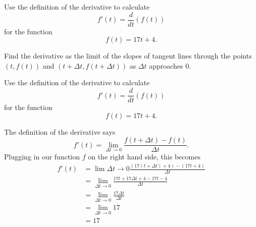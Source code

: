 \documentclass{ximera}
\author{Emma Smith Zbarsky}
\begin{document}
\begin{exercise}

Use the definition of the derivative to calculate
\[f'(t) = \frac{d}{dt}(f(t))\] for the function \[f(t) = 17t+4.\]


\begin{hint}
Find the derivative as the limit of the slopes of tangent lines through
the points $(t,f(t))$ and $(t+\Delta t, f(t+\Delta t))$ as $\Delta t$
approaches 0.
\end{hint}


\begin{hint}
Use the definition of the derivative to calculate
\[f'(t) = \frac{d}{dt}(f(t))\] for the function \[f(t) = 17t+4.\]

The definition of the derivative says
\[f'(t) = \lim_{\Delta t \to 0} \frac{f(t+\Delta t)-f(t)}{\Delta t}.\]
Plugging in our function $f$ on the right hand side, this becomes
\begin{align*} f'(t) & = \lim{\Delta t \to 0} \frac{\left(17(t+\Delta t)+4\right)-\left(17t+4\right)}{\Delta t} \\
&= \lim_{\Delta t \to 0} \frac{17t+17\Delta t + 4 - 17t -4}{\Delta t} \\
&= \lim_{\Delta t \to 0} \frac{17\Delta t}{\Delta t} \\
&= \lim_{\Delta t \to 0} 17
\\ & = \boxed{17}\end{align*}
\end{hint}


\begin{multipleChoice}
\end{multipleChoice}

\end{exercise}
\end{document}
